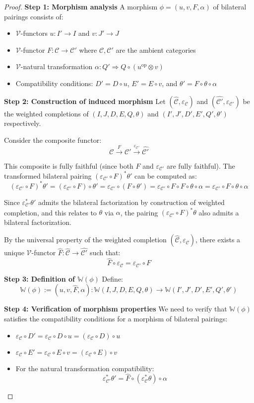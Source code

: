 \documentclass[11pt]{article}
\theoremstyle{plain}
\theoremstyle{definition}
\theoremstyle{remark}
\newcommand{\V}{\mathcal{V}}
\newcommand{\C}{\mathcal{C}}
\newcommand{\op}{\mathrm{op}}
\newcommand{\wh}[1]{\widehat{#1}}
\begin{document}
\begin{proof}
\textbf{Step 1: Morphism analysis}
A morphism $\phi = (u, v, F, \alpha)$ of bilateral pairings consists of:
\begin{itemize}
\item $\V$-functors $u : I' \to I$ and $v : J' \to J$
\item $\V$-functor $F : \C \to \C'$ where $\C, \C'$ are the ambient categories
\item $\V$-natural transformation $\alpha : Q' \Rightarrow Q \circ (u^{\op} \otimes v)$
\item Compatibility conditions: $D' = D \circ u$, $E' = E \circ v$, and $\theta' = F \circ \theta \circ \alpha$
\end{itemize}

\textbf{Step 2: Construction of induced morphism}
Let $(\wh{\C}, \varepsilon_\C)$ and $(\wh{\C'}, \varepsilon_{\C'})$ be the weighted completions of $(I, J, D, E, Q, \theta)$ and $(I', J', D', E', Q', \theta')$ respectively.

Consider the composite functor:
$$\C \xrightarrow{F} \C' \xrightarrow{\varepsilon_{\C'}} \wh{\C'}$$

This composite is fully faithful (since both $F$ and $\varepsilon_{\C'}$ are fully faithful). The transformed bilateral pairing $(\varepsilon_{\C'} \circ F)^* \theta'$ can be computed as:
$$(\varepsilon_{\C'} \circ F)^* \theta' = (\varepsilon_{\C'} \circ F) \circ \theta' = \varepsilon_{\C'} \circ (F \circ \theta') = \varepsilon_{\C'} \circ F \circ F \circ \theta \circ \alpha = \varepsilon_{\C'} \circ F \circ \theta \circ \alpha$$

Since $\varepsilon_{\C'}^* \theta'$ admits the bilateral factorization by construction of weighted completion, and this relates to $\theta$ via $\alpha$, the pairing $(\varepsilon_{\C'} \circ F)^* \theta$ also admits a bilateral factorization.

By the universal property of the weighted completion $(\wh{\C}, \varepsilon_\C)$, there exists a unique $\V$-functor $\wh{F} : \wh{\C} \to \wh{\C'}$ such that:
$$\wh{F} \circ \varepsilon_\C = \varepsilon_{\C'} \circ F$$

\textbf{Step 3: Definition of $\mathbb{W}(\phi)$}
Define:
$$\mathbb{W}(\phi) := (u, v, \wh{F}, \alpha) : \mathbb{W}(I, J, D, E, Q, \theta) \to \mathbb{W}(I', J', D', E', Q', \theta')$$

\textbf{Step 4: Verification of morphism properties}
We need to verify that $\mathbb{W}(\phi)$ satisfies the compatibility conditions for a morphism of bilateral pairings:
\begin{itemize}
\item $\varepsilon_\C \circ D' = \varepsilon_\C \circ D \circ u = (\varepsilon_\C \circ D) \circ u$ 
\item $\varepsilon_\C \circ E' = \varepsilon_\C \circ E \circ v = (\varepsilon_\C \circ E) \circ v$ 
\item For the natural transformation compatibility:
$$\varepsilon_{\C'}^* \theta' = \wh{F} \circ (\varepsilon_\C^* \theta) \circ \alpha$$
\end{itemize}


\end{proof}
\end{document}
